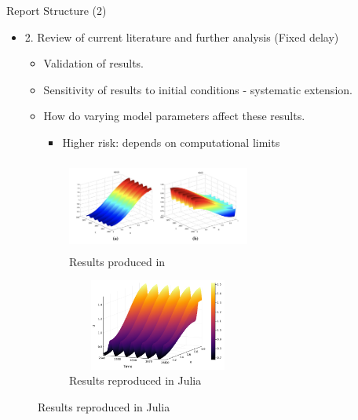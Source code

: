 \documentclass{beamer}
\begin{document}
\begin{frame}{Report Structure (2)}

    \begin{itemize}
        \item 2. Review of current literature and further analysis (Fixed delay)
        \begin{itemize}
            \item Validation of results.
            \item Sensitivity of results to initial conditions - systematic extension.
            \item How do varying model parameters affect these results.
            \begin{itemize}
                \item Higher risk: depends on computational limits
            \end{itemize}

        \end{itemize}
    \end{itemize}
    \begin{figure}[H]
        \begin{subfigure}[b]{0.45\linewidth}
            \centering
            \includegraphics[width=6cm,height=3cm]{res1.png}
            \caption{Results produced in \cite{jiang}}
        \end{subfigure}
        \begin{subfigure}[b]{0.45\linewidth}
            \centering
            \includegraphics[width=6cm,height=3cm]{repres.png}
            \caption{Results reproduced in Julia}
        \end{subfigure}
    \end{figure}
\end{frame}
\end{document}
